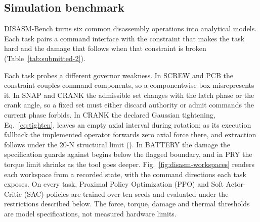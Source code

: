 \documentclass[12pt]{article}
\begin{document}
\subsection{Simulation benchmark}
\label{sec:design}
DISASM-Bench turns six common disassembly operations into analytical models.
Each task pairs a command interface with the constraint that makes the task
hard and the damage that follows when that constraint is broken
(Table~\ref{tab:submitted-2}).



Each task probes a different governor weakness. In
SCREW and PCB the constraint couples command components, so a componentwise
box misrepresents it. In SNAP and CRANK the admissible set changes with the
latch phase or the crank angle, so a fixed set must either discard authority or
admit commands the current phase forbids. In CRANK the declared Gaussian tightening,
Eq.~\eqref{eq:tighten}, leaves an empty axial interval during rotation; as its
execution fallback the implemented operator forwards zero axial force there, and
extraction follows under the 20-N structural limit (). In BATTERY the damage the specification guards against
begins below the flagged boundary, and in PRY the torque limit shrinks as the
tool goes deeper. Fig.~\ref{fig:disasm-workspaces} renders each workspace from
a recorded state, with the command directions each task exposes. On every
task, Proximal Policy Optimization (PPO) \cite{ref31} and Soft Actor-Critic
(SAC) \cite{ref32} policies are trained over ten seeds and evaluated under the
restrictions described below. The force, torque, damage and thermal thresholds
are model specifications, not measured hardware limits.
\end{document}
